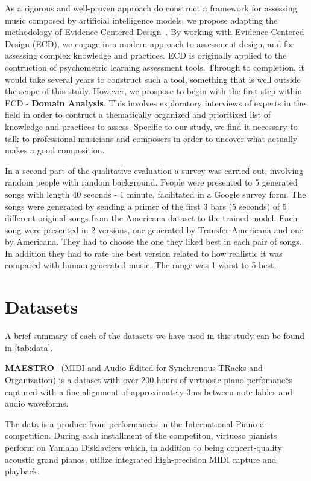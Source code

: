 \documentclass{IEEEtran}
\begin{document}
As a rigorous and well-proven approach do construct a framework for assessing
music composed by artificial intelligence models, we propose adapting the
methodology of Evidence-Centered
Design~\cite{mislevy2003focus,mislevy2017evidence}.
By working with
Evidence-Centered Design (ECD), we engage in a modern approach to assessment
design, and for assessing complex knowledge and practices. ECD is originally
applied to the contruction of psychometric learning assessment tools. Through
to completion, it would take several years to construct such a tool,
something that is well outside the scope of this study. However, we prospose
to begin with the first step within ECD - \textbf{Domain Analysis}. This
involves exploratory interviews of experts in the field in order to contruct
a thematically organized and prioritized list of knowledge and practices to
assess. Specific to our study, we find it necessary to talk to professional
musicians and composers in order to uncover what actually makes a good
composition.

In a second part of the qualitative evaluation a survey was carried out,
involving random people with random background. People were presented to 5
generated songs with length 40 seconds - 1 minute, facilitated in a Google
survey form. The songs were generated by sending a primer of the first 3 bars
(5 seconds) of 5 different original songs from the Americana dataset to the
trained model. Each song were presented in 2 versions, one generated by
Transfer-Americana and one by Americana. They had to choose the one they
liked best in each pair of songs. In addition they had to rate the best
version related to how realistic it was compared with human generated music.
The range was 1-worst to 5-best.

\section{Datasets}

A brief summary of each of the datasets we have used in this study can be
found in \autoref{tab:data}.

\textbf{MAESTRO}~\cite{maestrodataset} (MIDI and Audio Edited for Synchronous
TRacks and Organization) is a dataset with over 200 hours of virtuosic piano
perfomances captured with a fine alignment of approximately 3ms between note
lables and audio waveforms.

The data is a produce from performances in the International
Piano-e-competition. During each installment of the competiton, virtuoso
pianists perform on Yamaha Disklaviers which, in addition to being
concert-quality acoustic grand pianos, utilize integrated high-precision MIDI
capture and playback.
\end{document}
